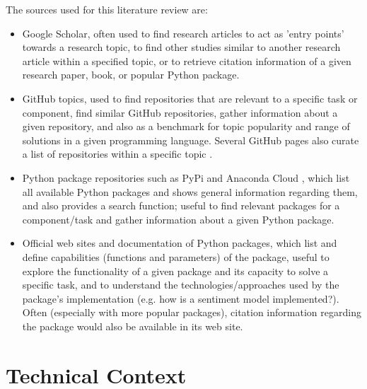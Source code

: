 \documentclass{report}
\begin{document}
The sources used for this literature review are:
\begin{itemize}
	\item Google Scholar, often used to find research articles to act as 'entry points' towards a research topic, to find other studies similar to another research article within a specified topic, or to retrieve citation information of a given research paper, book, or popular Python package.
	\item GitHub topics, used to find repositories that are relevant to a specific task or component, find similar GitHub repositories, gather information about a given repository, and also as a benchmark for topic popularity and range of solutions in a given programming language.
		Several GitHub pages also curate a list of repositories within a specific topic \cite{awesome-sentiment-analysis, awesome-nlp, awesome-machine-learning}.
	\item Python package repositories such as PyPi \cite{PyPi} and Anaconda Cloud \cite{Anaconda-Cloud}, which list all available Python packages and shows general information regarding them, and also provides a search function; useful to find relevant packages for a component/task and gather information about a given Python package.
	\item Official web sites and documentation of Python packages, which list and define capabilities (functions and parameters) of the package, useful to explore the functionality of a given package and its capacity to solve a specific task, and to understand the technologies/approaches used by the package's implementation (e.g. how is a sentiment model implemented?). 
		Often (especially with more popular packages), citation information regarding the package would also be available in its web site.
\end{itemize}

\section{Technical Context} \label{Technical Context}  %
\end{document}
